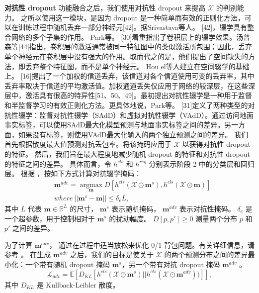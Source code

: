 \textbf{对抗性 dropout} 功能融合之后，我们使用对抗性 dropout \cite{park2018adversarial, lee2019drop} 来提高 $\mathcal{X}$ 的判别能力。
之所以使用这一模块，是因为 dropout 是一种简单而有效的正则化方法，可以在训练过程中随机丢弃一部分神经元[42]。据Srivastava等人。 [42]，辍学具有整合网络的多个子集的作用。 Park等。 [30]着重指出了卷积层上的辍学效果。汤普森等[44]指出，卷积层的激活通常被同一特征图中的类似激活所包围；因此，丢弃单个神经元在卷积层中没有强大的作用。取而代之的是，他们提出了空间缺失的方法，即丢弃整个特征图，而不是单个神经元。 Hou el等人建立在空间辍学的基础上。 [16]提出了一个加权的信道丢弃，该信道对各个信道使用可变的丢弃率，其中丢弃率取决于信道的平均激活值。加权通道丢失仅应用于网络的较深层，在这些深层中，激活具有很高的特异性[51、50、49]。最初提出对抗性辍学是一种用于监督和半监督学习的有效正则化方法。更具体地说，Park等。 [31]定义了两种类型的对抗性辍学：监督对抗性辍学（SAdD）和虚拟对抗性辍学（VAdD）。通过访问地面事实标签，可以使用SAdD最大化模型预测与地面事实标签之间的差异。另一方面，如果没有标签，则使用VAdD最大化输入的两个独立预测之间的差异。%
我们首先根据散度最大值预测对抗丢包率。将该掩码应用于 $\mathcal{X}$ 以获得对抗性 dropout 的特征。
然后，我们旨在最大程度地减少随机 dropout 的特征和对抗性 dropout 的特征之间的差异。
具体而言，令 $h^{cls}$ 和 $h^{reg}$ 分别表示阶段 2 中的分类层和回归层。
根据 \cite{lee2019drop}，按如下方式计算对抗辍学掩码：
\begin{equation}
\begin{split}
    & \mathbf{m}^{adv} = \mathop{\arg\max}\limits_{\mathbf{m}}D[h^{cls}(\mathcal{X} \odot \mathbf{m}^s), h^{cls}(\mathcal{X} \odot \mathbf{m})] \\
    & where~||\mathbf{m}^s - \mathbf{m}|| \leq \delta_e L,
\end{split}
\end{equation}
其中 $L$ 代表 $\mathbf{m} \in \mathbb R^L$ 的尺寸，
$\mathbf{m}^s$ 表示随机掩码， $\mathbf{m}^{adv}$ 表示对抗性掩码。
$\delta_{e}$ 是一个超参数，用于控制相对于 $\mathbf{m}^{s}$ \cite{lee2019drop}的扰动幅度。
$D[p, p'] \geq 0$ 测量两个分布 $p$ 和 $p'$ 之间的差异。

为了计算 $\mathbf{m}^{adv}$，\cite{park2018adversarial} 通过在过程中适当放松来优化 0/1 背包问题。有关详细信息，请参考 \cite{park2018adversarial}。
在生成 $\mathbf{m}^{adv}$ 之后，我们的目标是使关于 $\mathcal{X}$ 的两个预测分布之间的差异最小化：一个带有随机 dropout 掩码 $\mathbf{m}^{s}$，另一个带有对抗 dropout 掩码 $\mathbf{m}^{adv}$ \cite{lee2019drop}。
\begin{equation}
    \mathcal{L}_{adv} = \mathbb E[D_{KL}[h^{cls}(\mathcal{X} \odot\mathbf{m}^{s})||h^{cls}(\mathcal{X} \odot\mathbf{m}^{adv}))]],
\end{equation}
其中 $D_{KL}$ 是 Kullback-Leibler 散度。

